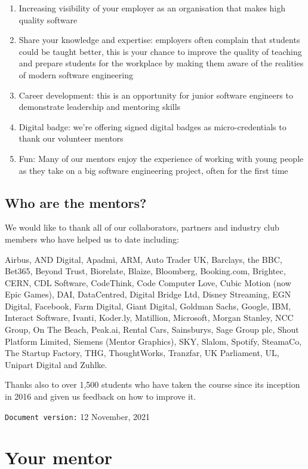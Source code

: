 \documentclass[
]{book}
\providecommand{\tightlist}{%
  \setlength{\itemsep}{0pt}\setlength{\parskip}{0pt}}
\begin{document}
\begin{enumerate}
\def\labelenumi{\arabic{enumi}.}
\tightlist
\item
  Increasing visibility of your employer as an organisation that makes high quality software
\item
  Share your knowledge and expertise: employers often complain that students could be taught better, this is your chance to improve the quality of teaching and prepare students for the workplace by making them aware of the realities of modern software engineering
\item
  Career development: this is an opportunity for junior software engineers to demonstrate leadership and mentoring skills
\item
  Digital badge: we're offering signed digital badges as micro-credentials to thank our volunteer mentors
\item
  Fun: Many of our mentors enjoy the experience of working with young people as they take on a big software engineering project, often for the first time
\end{enumerate}

\hypertarget{thanks}{%
\section{Who are the mentors?}\label{thanks}}

We would like to thank all of our collaborators, partners and industry club members who have helped us to date including:

Airbus, AND Digital, Apadmi, ARM, Auto Trader UK, Barclays, the BBC, Bet365, Beyond Trust, Biorelate, Blaize, Bloomberg, Booking.com, Brightec, CERN, CDL Software, CodeThink, Code Computer Love, Cubic Motion (now Epic Games), DAI, DataCentred, Digital Bridge Ltd, Disney Streaming, EGN Digital, Facebook, Farm Digital, Giant Digital, Goldman Sachs, Google, IBM, Interact Software, Ivanti, Koder.ly, Matillion, Microsoft, Morgan Stanley, NCC Group, On The Beach, Peak.ai, Rental Cars, Sainsburys, Sage Group plc, Shout Platform Limited, Siemens (Mentor Graphics), SKY, Slalom, Spotify, SteamaCo, The Startup Factory, THG, ThoughtWorks, Tranzfar, UK Parliament, UL, Unipart Digital and Zuhlke.

Thanks also to over 1,500 students who have taken the course since its inception in 2016 and given us feedback on how to improve it.

\texttt{Document\ version:} 12 November, 2021

\hypertarget{ourmentor}{%
\chapter{Your mentor}\label{ourmentor}}
\end{document}
